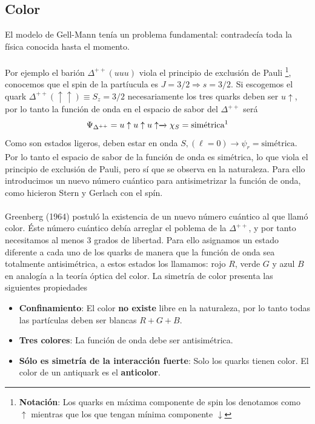 \subsection{Color}
El modelo de Gell-Mann tenía un problema fundamental: contradecía toda la física conocida hasta el momento.\\\\
Por ejemplo el barión $\Delta^{++}(uuu)$ viola el principio de exclusión de Pauli \footnote{\textbf{Notación}: Los quarks en máxima componente de spin los denotamos como $\uparrow$ mientras que los que tengan mínima componente $\downarrow$}, conocemos que el spin de la partíucula es $J=3/2 \Rightarrow s=3/2$. Si escogemos el quark $\Delta^{++}(\uparrow \uparrow)\equiv S_z=3/2$ necesariamente los tres quarks deben ser $u \uparrow$, por lo tanto la función de onda en el espacio de sabor del $\Delta^{++}$ será $$\Psi_{\Delta^{++}}=u\uparrow u\uparrow u\uparrow \xrightarrow[]{} \chi_S=\text{simétrica\footnotemark}$$
Como son estados ligeros, deben estar en onda $S, (\ell=0) \xrightarrow[]{} \psi_r=\text{simétrica}$. Por lo tanto el espacio de sabor de la función de onda es simétrica, lo que viola el principio de exclusión de Pauli, pero sí que se observa en la naturaleza. Para ello introducimos un nuevo número cuántico para antisimetrizar la función de onda, como hicieron Stern y Gerlach con el spín.\\\\
Greenberg (1964) postuló la existencia de un nuevo número cuántico al que llamó color. Éste número cuántico debía arreglar el poblema de la $\Delta^{++}$, y por tanto necesitamos al menos 3 grados de libertad. Para ello asignamos un estado diferente a cada uno de los quarks de manera que la función de onda sea totalmente antisimétrica, a estos estados los llamamos: rojo $R$, verde $G$ y azul $B$ en analogía a la teoría óptica del color. La simetría de color presenta las siguientes propiedades
\newpage
\begin{itemize}
    \item \textbf{Confinamiento}: El color \textbf{no existe} libre en la naturaleza, por lo tanto todas las partículas deben ser blancas $R+G+B$.
    \item \textbf{Tres colores}: La función de onda debe ser antisimétrica.
    \item \textbf{Sólo es simetría de la interacción fuerte}: Solo los quarks tienen color. El color de un antiquark es el \textbf{anticolor}.
\end{itemize}


